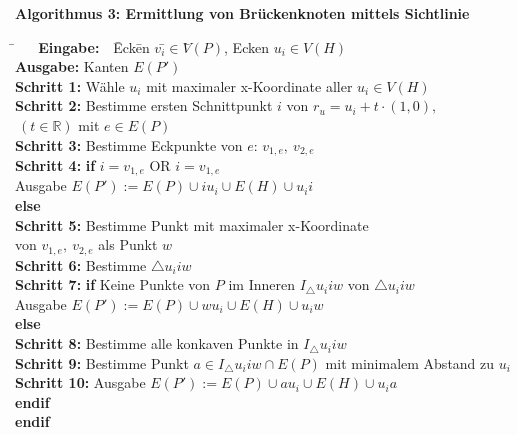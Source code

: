 \begin{flushleft}
  { \textbf{Algorithmus 3: Ermittlung von Brückenknoten mittels Sichtlinie\cite{eberly}}
        \begin{tabbing}
          \=$~~~~~~$ \= \textbf{Eingabe:} $~~~$\=  Eck\=en $v_i$\=$ \in V$\=$(P)$, Ecken $u_i \in V(H)$\\
          \> \> \textbf{Ausgabe:} \> Kanten $E(P')$\\
          \> \> \textbf{Schritt 1:} \> Wähle $u_i$ mit maximaler x-Koordinate aller $u_i \in V(H)$\\
          \> \> \textbf{Schritt 2:} \> Bestimme ersten Schnittpunkt $i$ von $r_u = u_i + t \cdot (1,0),$\\
          \> \> \> $~(t \in \mathbb{R})$ mit $e \in E(P)$\\
          \> \> \textbf{Schritt 3:} \> Bestimme Eckpunkte von $e$: $v_{1,e},~v_{2,e}$\\
          \> \> \textbf{Schritt 4:} \> \textbf{if} $i = v_{1,e}$ OR $i = v_{1,e}$\\
          \> \> \> \> Ausgabe $E(P') := E(P) \cup iu_i \cup E(H) \cup u_ii$\\
          \> \> \>\textbf{else}\\
          \> \> \textbf{Schritt 5:} \> \> Bestimme Punkt mit maximaler x-Koordinate\\
          \> \> \> \> von $v_{1,e},~v_{2,e}$ als Punkt $w$\\
          \> \> \textbf{Schritt 6:} \> \> Bestimme $\triangle u_iiw$\\
          \> \> \textbf{Schritt 7:} \> \> \textbf{if} Keine Punkte von $P$ im Inneren $I_\triangle u_iiw$ von $\triangle u_iiw$\\
          \> \> \> \> \> \> Ausgabe $E(P') := E(P) \cup wu_i \cup E(H) \cup u_iw$\\
          \> \> \> \>\textbf{else}\\
          \> \> \textbf{Schritt 8:} \> \> \> \> Bestimme alle konkaven Punkte in $I_\triangle u_iiw$\\
          \> \> \textbf{Schritt 9:} \> \> \> \> Bestimme Punkt $a \in I_\triangle u_iiw \cap E(P)$ mit minimalem Abstand zu $u_i$\\
          \> \> \textbf{Schritt 10:} \> \> \> \> Ausgabe $E(P') := E(P) \cup au_i \cup E(H) \cup u_ia$\\
          \> \> \> \> \textbf{endif}\\
          \> \> \>\textbf{endif}\\

        \end{tabbing}
}
\end{flushleft}

